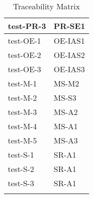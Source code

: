 \documentclass[12pt, titlepage]{article}
\begin{document}
\begin{center}
\begin{longtable}{|>{\centering\arraybackslash}p{4cm}|>{\centering\arraybackslash}p{10cm}|}
    \hline
    test-PR-3 & PR-SE1 \\
    \hline
    test-OE-1 & OE-IAS1 \\
    \hline
    test-OE-2 & OE-IAS2 \\
    \hline
    test-OE-3 & OE-IAS3 \\
    \hline
    test-M-1 & MS-M2 \\
    \hline
    test-M-2 & MS-S3 \\
    \hline
    test-M-3 & MS-A2 \\
    \hline
    test-M-4 & MS-A1 \\
    \hline
    test-M-5 & MS-A3 \\
    \hline
    test-S-1 & SR-A1 \\
    \hline
    test-S-2 & SR-A1 \\
    \hline
    test-S-3 & SR-A1 \\
    \hline
  
    \caption{Traceability Matrix}
    \end{longtable}
    \end{center}
		
\end{document}
